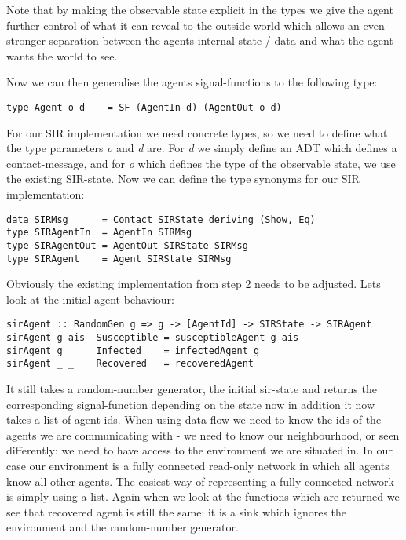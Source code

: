 Note that by making the observable state explicit in the types we give the agent further control of what it can reveal to the outside world which allows an even stronger separation between the agents internal state / data and what the agent wants the world to see.

Now we can then generalise the agents signal-functions to the following type:
\begin{verbatim}
type Agent o d    = SF (AgentIn d) (AgentOut o d)
\end{verbatim}

For our SIR implementation we need concrete types, so we need to define what the type parameters \textit{o} and \textit{d} are. For \textit{d} we simply define an ADT which defines a contact-message, and for \textit{o} which defines the type of the observable state, we use the existing SIR-state. Now we can define the type synonyms for our SIR implementation:
\begin{verbatim}
data SIRMsg      = Contact SIRState deriving (Show, Eq)
type SIRAgentIn  = AgentIn SIRMsg
type SIRAgentOut = AgentOut SIRState SIRMsg
type SIRAgent    = Agent SIRState SIRMsg
\end{verbatim}

Obviously the existing implementation from step 2 needs to be adjusted. Lets look at the initial agent-behaviour:

\begin{verbatim}
sirAgent :: RandomGen g => g -> [AgentId] -> SIRState -> SIRAgent
sirAgent g ais  Susceptible = susceptibleAgent g ais
sirAgent g _    Infected    = infectedAgent g
sirAgent _ _    Recovered   = recoveredAgent
\end{verbatim}

It still takes a random-number generator, the initial sir-state and returns the corresponding signal-function depending on the state now in addition it now takes a list of agent ids. When using data-flow we need to know the ids of the agents we are communicating with - we need to know our neighbourhood, or seen differently: we need to have access to the environment we are situated in. In our case our environment is a fully connected read-only network in which all agents know all other agents. The easiest way of representing a fully connected network is simply using a list.
Again when we look at the functions which are returned we see that recovered agent is still the same: it is a sink which ignores the environment and the random-number generator. 

